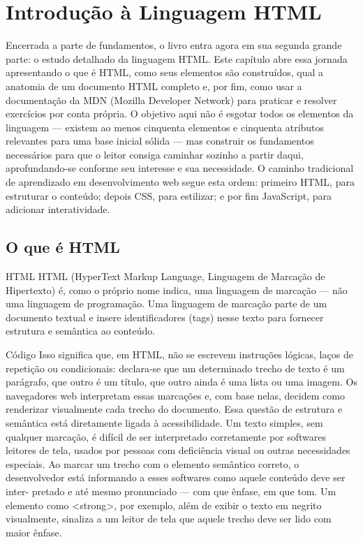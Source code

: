 \chapter{Introdução à Linguagem HTML}

Encerrada a parte de fundamentos, o livro entra agora em sua segunda grande parte: o estudo detalhado da linguagem HTML. Este capítulo abre essa jornada apresentando o que é HTML, como seus elementos são construídos, qual a anatomia de um documento HTML completo e, por fim, como usar a documentação da MDN (Mozilla Developer Network) para praticar e resolver exercícios por conta própria. O objetivo aqui não é esgotar todos os elementos da linguagem — existem ao menos cinquenta elementos e cinquenta atributos relevantes para uma base inicial sólida — mas construir os fundamentos necessários para que o leitor consiga caminhar sozinho a partir daqui, aprofundando-se conforme seu interesse e sua necessidade. O caminho tradicional de aprendizado em desenvolvimento web segue esta ordem: primeiro HTML, para estruturar o conteúdo; depois CSS, para estilizar; e por fim JavaScript, para adicionar interatividade.

\section{O que é HTML}

\begin{codebox}{HTML}
 HTML (HyperText Markup Language, Linguagem de Marcação de Hipertexto) é,
 como o próprio nome indica, uma linguagem de marcação — não uma linguagem
 de programação. Uma linguagem de marcação parte de um documento textual
 e insere identificadores (tags) nesse texto para fornecer estrutura e semântica ao
 conteúdo.
\end{codebox}

\begin{codebox}{Código}
Isso significa que, em HTML, não se escrevem instruções lógicas, laços de repetição
ou condicionais: declara-se que um determinado trecho de texto é um parágrafo, que
outro é um título, que outro ainda é uma lista ou uma imagem. Os navegadores web
interpretam essas marcações e, com base nelas, decidem como renderizar visualmente
cada trecho do documento.
Essa questão de estrutura e semântica está diretamente ligada à acessibilidade.
Um texto simples, sem qualquer marcação, é difícil de ser interpretado corretamente
por softwares leitores de tela, usados por pessoas com deficiência visual ou outras
necessidades especiais. Ao marcar um trecho com o elemento semântico correto, o
desenvolvedor está informando a esses softwares como aquele conteúdo deve ser inter-
pretado e até mesmo pronunciado — com que ênfase, em que tom. Um elemento como
<strong>, por exemplo, além de exibir o texto em negrito visualmente, sinaliza a um
leitor de tela que aquele trecho deve ser lido com maior ênfase.
\end{codebox}

